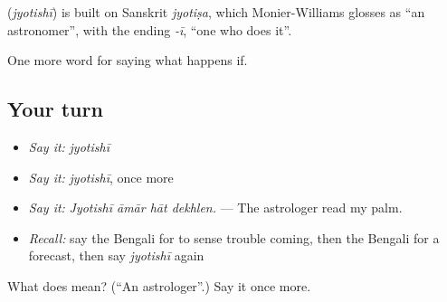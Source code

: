 \begin{cousinweb}
\textbf{} (\emph{jyotishī}) is built on Sanskrit \emph{jyotiṣa}, which Monier-Williams glosses as \textquotedblleft{}an astronomer\textquotedblright{}, with the ending \emph{-ī}, \textquotedblleft{}one who does it\textquotedblright{}.
\end{cousinweb}

\begin{grammarlens}[title={What you've built}]
One more word for saying what happens if.
\end{grammarlens}

\subsection*{Your turn}
\begin{itemize}
\raggedright
  \item \emph{Say it:} \emph{jyotishī}
  \item \emph{Say it:} \emph{jyotishī}, once more
  \item \emph{Say it:} \emph{Jyotishī āmār hāt dekhlen.} — The astrologer read my palm.
  \item \emph{Recall:} say the Bengali for to sense trouble coming, then the Bengali for a forecast, then say \emph{jyotishī} again
\end{itemize}

\begin{tcolorbox}[breakable,colback=teal!4,colframe=teal!35!black,title={Before you move on}]
What does  mean? (\textquotedblleft{}An astrologer\textquotedblright{}.) Say it once more.
\end{tcolorbox}
